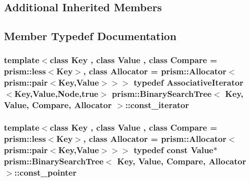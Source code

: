 \subsection*{Additional Inherited Members}


\subsection{Member Typedef Documentation}
\subsubsection[{\texorpdfstring{const\+\_\+iterator}{const_iterator}}]{\setlength{\rightskip}{0pt plus 5cm}template$<$class Key , class Value , class Compare  = prism\+::less$<$\+Key$>$, class Allocator  = prism\+::\+Allocator$<$prism\+::pair$<$\+Key,\+Value$>$$>$$>$ typedef {\bf Associative\+Iterator}$<$Key,Value,{\bf Node},true$>$ {\bf prism\+::\+Binary\+Search\+Tree}$<$ Key, Value, Compare, {\bf Allocator} $>$\+::{\bf const\+\_\+iterator}}\hypertarget{classprism_1_1_binary_search_tree_ae72115785a3c50de35a62aa5ef102afd}{}\label{classprism_1_1_binary_search_tree_ae72115785a3c50de35a62aa5ef102afd}
\subsubsection[{\texorpdfstring{const\+\_\+pointer}{const_pointer}}]{\setlength{\rightskip}{0pt plus 5cm}template$<$class Key , class Value , class Compare  = prism\+::less$<$\+Key$>$, class Allocator  = prism\+::\+Allocator$<$prism\+::pair$<$\+Key,\+Value$>$$>$$>$ typedef const Value$\ast$ {\bf prism\+::\+Binary\+Search\+Tree}$<$ Key, Value, Compare, {\bf Allocator} $>$\+::{\bf const\+\_\+pointer}}\hypertarget{classprism_1_1_binary_search_tree_a165bd59f5169479a5208e1c746943e2e}{}\label{classprism_1_1_binary_search_tree_a165bd59f5169479a5208e1c746943e2e}
